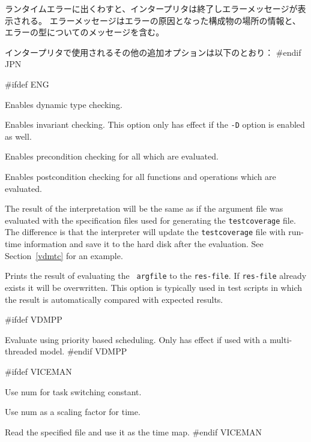\documentclass[\pformat,12pt]{article}
\begin{document}
ランタイムエラーに出くわすと、インタープリタは終了しエラーメッセージが表示される。
エラーメッセージはエラーの原因となった構成物の場所の情報と、エラーの型についてのメッセージを含む。

インタープリタで使用されるその他の追加オプションは以下のとおり： 
#endif JPN

\begin{description}

#ifdef ENG
\item[{\tt -D}] Enables dynamic type checking.
  
\item[{\tt -I}] Enables invariant checking. This option only has effect if the {\tt -D} option is enabled as well.

\item[{\tt -P}] Enables precondition checking for all
which are evaluated. 

\item[{\tt -Q}] Enables postcondition checking for all functions and
operations which are evaluated.

\item[{\tt -R}] 
  The result of the interpretation will be the same as if the argument
  file was evaluated with the specification files used for generating
  the {\tt testcoverage} file. The difference is that the interpreter
  will update the {\tt testcoverage} file with run-time information and
  save it to the hard disk after the evaluation. See Section~\ref{vdmtc}
  for an example.
  
\item[{\tt -O res-file}] Prints the result of evaluating the {\tt
    argfile} to the {\tt res-file}. If {\tt res-file} already exists
  it will be overwritten. This option is typically used in test
  scripts in which the result is automatically compared with expected
  results.

#ifdef VDMPP
\item[{\tt -Z priority-file}] Evaluate using priority based
  scheduling. Only has effect if used with a multi-threaded model.
#endif VDMPP

#ifdef VICEMAN
\item[{\tt -T num}] Use num for task switching constant.
\item[{\tt -X num}] Use num as a scaling factor for time.
\item[{\tt -F time-file}] 
                    Read the specified file and use it as the time map.
#endif VICEMAN


\end{description}
\end{document}
